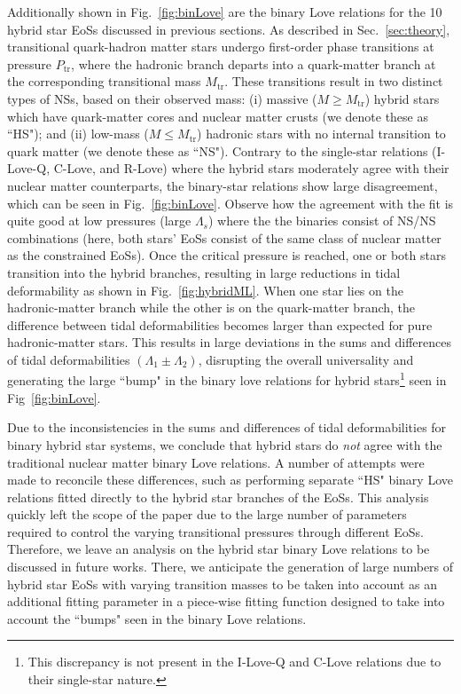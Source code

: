 \documentclass[prd,twocolumn,nofootinbib,superscriptaddress,amsmath,amssymb]{revtex4-1}
\begin{document}
Additionally shown in Fig.~\ref{fig:binLove} are the binary Love relations for the 10 hybrid star EoSs discussed in previous sections.
As described in Sec.~\ref{sec:theory}, transitional quark-hadron matter stars undergo first-order phase transitions at pressure $P_{\text{tr}}$, where the hadronic branch departs into a quark-matter branch at the corresponding transitional mass $M_{\text{tr}}$.
These transitions result in two distinct types of NSs, based on their observed mass: (i) massive ($M \geq M_{\text{tr}}$) hybrid stars which have quark-matter cores and nuclear matter crusts (we denote these as ``HS"); and (ii) low-mass ($M \leq M_{\text{tr}}$) hadronic stars with no internal transition to quark matter (we denote these as ``NS").
Contrary to the single-star relations (I-Love-Q, C-Love, and R-Love) where the hybrid stars moderately agree with their nuclear matter counterparts, the binary-star relations show large disagreement, which can be seen in Fig.~\ref{fig:binLove}.
Observe how the agreement with the fit is quite good at low pressures (large $\Lambda_s$) where the the binaries consist of NS/NS combinations (here, both stars' EoSs consist of the same class of nuclear matter as the constrained EoSs).
Once the critical pressure is reached, one or both stars transition into the hybrid branches, resulting in large reductions in tidal deformability as shown in Fig.~\ref{fig:hybridML}.
When one star lies on the hadronic-matter branch while the other is on the quark-matter branch, 
the difference between tidal deformabilities becomes larger than expected for pure hadronic-matter stars.
This results in large deviations in the sums and differences of tidal deformabilities $(\Lambda_1 \pm \Lambda_2)$, disrupting the overall universality and generating the large ``bump" in the binary love relations for hybrid stars\footnote{This discrepancy is not present in the I-Love-Q and C-Love relations due to their single-star nature.} seen in Fig~\ref{fig:binLove}.

Due to the inconsistencies in the sums and differences of tidal deformabilities for binary hybrid star systems, we conclude that hybrid stars do \emph{not} agree with the traditional nuclear matter binary Love relations.
A number of attempts were made to reconcile these differences, such as performing separate ``HS" binary Love relations fitted directly to the hybrid star branches of the EoSs.
This analysis quickly left the scope of the paper due to the large number of parameters required to control the varying transitional pressures through different EoSs.
Therefore, we leave an analysis on the hybrid star binary Love relations to be discussed in future works.
There, we anticipate the generation of large numbers of hybrid star EoSs with varying transition masses to be taken into account as an additional fitting parameter in a piece-wise fitting function designed to take into account the ``bumps" seen in the binary Love relations.
\end{document}
